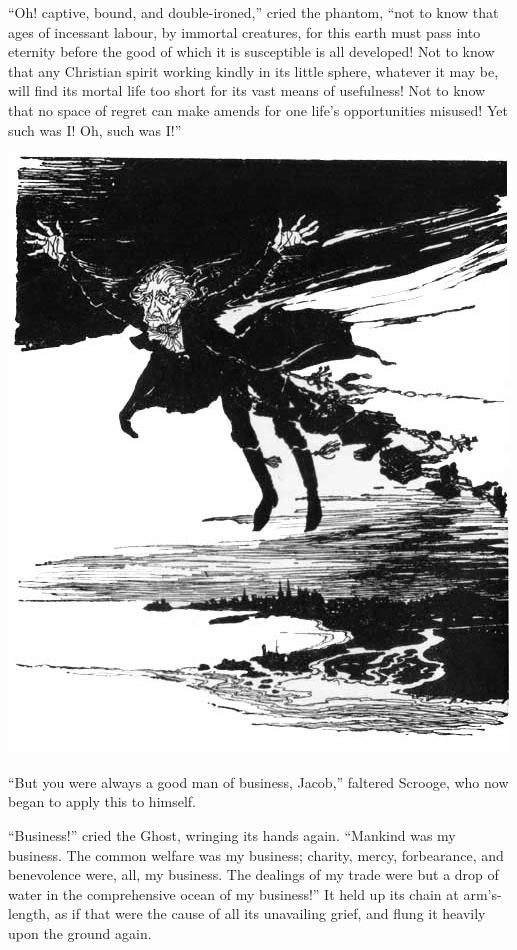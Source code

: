 \documentclass[paper=5.5in:8.5in,BCOR=15mm,twoside,DIV=15,headinclude=off,12pt,chapterprefix=off,openany,headings=huge]{scrbook} %
\begin{document}
\enquote{Oh! captive, bound, and double-ironed,} cried the phantom, \enquote{not to know that ages of incessant labour, by immortal creatures, for this earth must pass into eternity before the good of which it is susceptible is all developed! Not to know that any Christian spirit working kindly in its little sphere, whatever it may be, will find its mortal life too short for its vast means of usefulness! Not to know that no space of regret can make amends for one life's opportunities misused! Yet such was I! Oh, such was I!}
\cleardoubleevenemptypage
\begin{center} 
\vfill
    \includegraphics[width=\columnwidth]{gs045}
    \vfill
\end{center}
\newpage

\enquote{But you were always a good man of business, Jacob,} faltered Scrooge, who now began to apply this to himself.

\enquote{Business!} cried the Ghost, wringing its hands again. \enquote{Mankind was my business. The common welfare was my business; charity, mercy, forbearance, and benevolence were, all, my business. The dealings of my trade were but a drop of water in the comprehensive ocean of my business!}
It held up its chain at arm's-length, as if that were the cause of all its unavailing grief, and flung it heavily upon the ground again.
\end{document}
